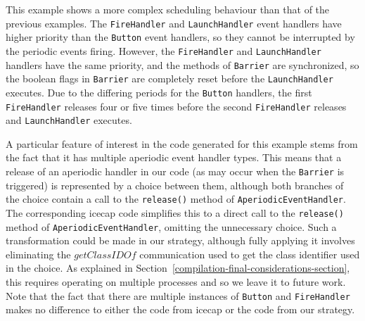 This example shows a more complex scheduling behaviour than that of
the previous examples.
The \texttt{FireHandler} and \texttt{LaunchHandler} event handlers
have higher priority than the \texttt{Button} event handlers, so they
cannot be interrupted by the periodic events firing.
However, the \texttt{FireHandler} and \texttt{LaunchHandler} handlers
have the same priority, and the methods of \texttt{Barrier} are
synchronized, so the boolean flags in \texttt{Barrier} are completely
reset before the \texttt{LaunchHandler} executes.
Due to the differing periods for the \texttt{Button} handlers, the
first \texttt{FireHandler} releases four or five times before the second
\texttt{FireHandler} releases and \texttt{LaunchHandler} executes.

A particular feature of interest in the code generated for this
example stems from the fact that it has multiple aperiodic event
handler types.
This means that a release of an aperiodic handler in our code (as may
occur when the \texttt{Barrier} is triggered) is represented by a
choice between them, although both branches of the choice contain a
call to the \texttt{release()} method of
\texttt{AperiodicEventHandler}.
The corresponding icecap code simplifies this to a direct call to the
\texttt{release()} method of \texttt{AperiodicEventHandler}, omitting
the unnecessary choice.
Such a transformation could be made in our strategy, although fully
applying it involves eliminating the $getClassIDOf$ communication used
to get the class identifier used in the choice.
As explained in
Section~\ref{compilation-final-considerations-section}, this requires
operating on multiple processes and so we leave it to future work.
Note that the fact that there are multiple instances of
\texttt{Button} and \texttt{FireHandler} makes no difference to either
the code from icecap or the code from our strategy.

